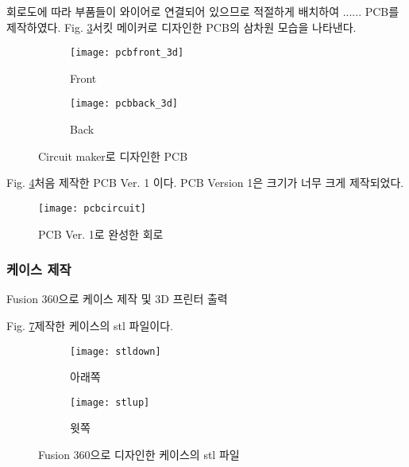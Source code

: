 회로도에 따라 부품들이 와이어로 연결되어 있으므로 적절하게 배치하여 ......    PCB를 제작하였다. Fig. \ref{fig:pcb}\은 서킷 메이커로 디자인한 PCB의 삼차원 모습을 나타낸다.

\begin{figure}[h]
	\begin{center}
	\begin{subfigure}{0.45\textwidth}
		\texttt{[image: pcbfront\_3d]} 
		\caption{Front}
		\label{fig:pcbfront_3d}
	\end{subfigure}
	\begin{subfigure}{0.45\textwidth}
		\texttt{[image: pcbback\_3d]}
		\caption{Back}
		\label{fig:pcbback_3d}
	\end{subfigure}
	\caption{Circuit maker로 디자인한 PCB}
	\label{fig:pcb}
	\end{center}
\end{figure}

Fig. \ref{fig:pcbcircuit}\은 처음 제작한 PCB Ver. 1 이다. PCB Version 1은 크기가 너무 크게 제작되었다.
\begin{figure}[H]
	\begin{center}
		\texttt{[image: pcbcircuit]}
		\caption{PCB Ver. 1로 완성한 회로}
		\label{fig:pcbcircuit}
	\end{center}
\end{figure}




\subsubsection{케이스 제작}

Fusion 360으로 케이스 제작 및 3D 프린터 출력


Fig. \ref{fig:stl}\은 제작한 케이스의 stl 파일이다. 

\begin{figure}[h]
	\begin{center}
		\begin{subfigure}{0.45\textwidth}
			\texttt{[image: stldown]} 
			\caption{아래쪽}
			\label{fig:stldown}
		\end{subfigure}
		\begin{subfigure}{0.45\textwidth}
			\texttt{[image: stlup]}
			\caption{윗쪽}
			\label{fig:stlup}
		\end{subfigure}
		\caption{Fusion 360으로 디자인한 케이스의 stl 파일}
		\label{fig:stl}
	\end{center}
\end{figure}




